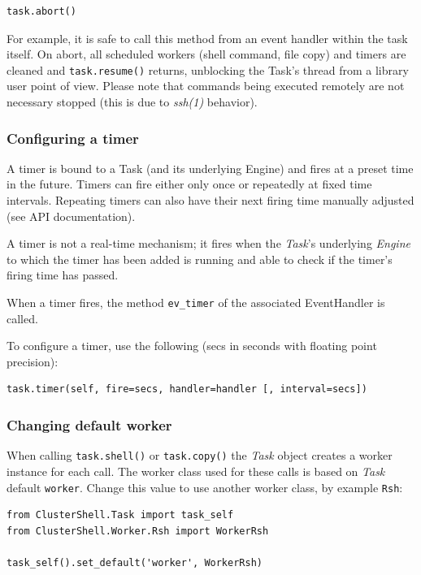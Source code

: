 \documentclass[english,a4paper]{csuserguide}
\newcommand{\Task}{\textit{Task}\xspace}
\newcommand{\Engine}{\textit{Engine}\xspace}
\begin{document}
\begin{lstlisting}[breaklines=true, breakatwhitespace=true]
task.abort()
\end{lstlisting}

For example, it is safe to call this method from an event handler within the task itself. On abort, all scheduled workers (shell command, file copy) and timers are cleaned and \lstinline+task.resume()+ returns, unblocking the Task's thread from a library user point of view. Please note that commands being executed remotely are not necessary stopped (this is due to \textit{ssh(1)} behavior).

\subsubsection{Configuring a timer}

A timer is bound to a Task (and its underlying Engine) and fires at a preset time in the future. Timers can fire either only once or repeatedly at fixed time intervals. Repeating timers can also have their next firing time manually adjusted (see API documentation).

A timer is not a real-time mechanism; it fires when the \Task's underlying \Engine to which the timer has been added is running and able to check if the timer's firing time has passed.

When a timer fires, the method \lstinline+ev_timer+ of the associated EventHandler is called.

To configure a timer, use the following (secs in seconds with floating point precision):
\medskip
\begin{lstlisting}[breaklines=true, breakatwhitespace=true]
task.timer(self, fire=secs, handler=handler [, interval=secs])
\end{lstlisting}

\subsubsection{Changing default worker}
\label{task-default-worker}

When calling \lstinline+task.shell()+ or \lstinline+task.copy()+ the \Task object creates a worker instance for each call. The worker class used for these calls is based on \Task default \verb+worker+. Change this value to use another worker class, by example \lstinline+Rsh+:
\medskip
\begin{lstlisting}[breaklines=true, breakatwhitespace=true]
from ClusterShell.Task import task_self
from ClusterShell.Worker.Rsh import WorkerRsh

task_self().set_default('worker', WorkerRsh)
\end{lstlisting}
\end{document}
